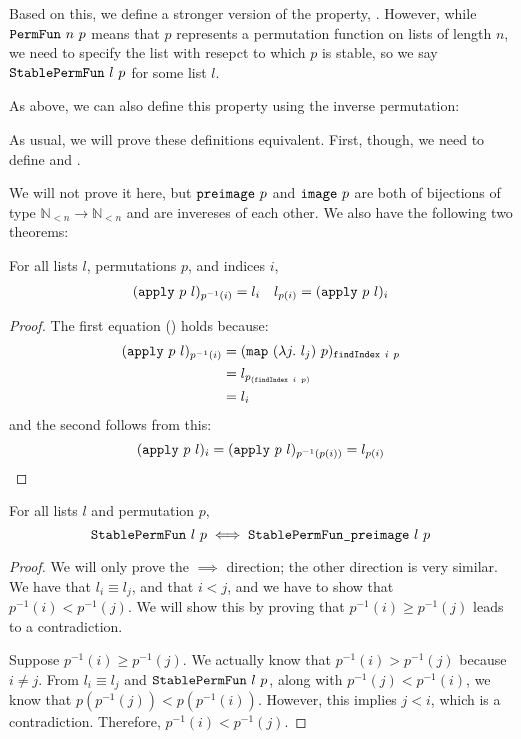 \documentclass[11pt]{thesis}
\begin{document}
Based on this, we define a stronger version of the 
property, . However, while $\texttt{PermFun}~n~p$
means that $p$ represents a permutation function on lists of length
$n$, we need to specify the list with resepct to which $p$ is stable,
so we say $\texttt{StablePermFun}~l~p$ for some list $l$.

As above, we can also define this property using the inverse
permutation:

As usual, we will prove these definitions equivalent. First, though,
we need to define  and .

We will not prove it here, but $\texttt{preimage}~p$ and $\texttt{image}~p$
are both of bijections of type $\mathbb{N}_{<n} \to \mathbb{N}_{<n}$
and are invereses of each other. We also have the following two
theorems:
\begin{theorem}
  For all lists $l$, permutations $p$, and indices $i$,
  \begin{align*}
    (\texttt{apply}~p~l)_{p^{-1}(i)} = l_i && l_{p(i)} = (\texttt{apply}~p~l)_i
  \end{align*}
\end{theorem}
\begin{proof}
  The first equation () holds because:
  \begin{align*}
       (\texttt{apply}~p~l)_{p^{-1}(i)}
    &= (\texttt{map}~(\lambda j.~l_j)~p)_{\texttt{findIndex}~i~p} \\
    &= l_{p_{(\texttt{findIndex}~i~p)}} \\
    &= l_i
  \end{align*}
  and the second follows from this:
  \begin{equation*}
      (\texttt{apply}~p~l)_i
    = (\texttt{apply}~p~l)_{p^{-1}(p(i))}
    = l_{p(i)}
    \qedhere
  \end{equation*}
\end{proof}

\begin{theorem}
  For all lists $l$ and permutation $p$,
  \begin{equation*}
    \texttt{StablePermFun}~l~p \iff \texttt{StablePermFun\_preimage}~l~p
  \end{equation*}
\end{theorem}
\begin{proof}
  We will only prove the $\implies$ direction; the other direction is
  very similar. We have that $l_i \equiv l_j$, and that $i < j$, and we
  have to show that $p^{-1}(i) < p^{-1}(j)$. We will show this by
  proving that $p^{-1}(i) \ge p^{-1}(j)$ leads to a contradiction.

  Suppose $p^{-1}(i) \ge p^{-1}(j)$. We actually know that $p^{-1}(i) >
  p^{-1}(j)$ because $i \neq j$. From $l_i \equiv l_j$ and
  $\texttt{StablePermFun}~l~p$, along with $p^{-1}(j) < p^{-1}(i)$, we
  know that $p(p^{-1}(j)) < p(p^{-1}(i))$. However, this implies $j <
  i$, which is a contradiction. Therefore, $p^{-1}(i) < p^{-1}(j)$.
\end{proof}
\end{document}
